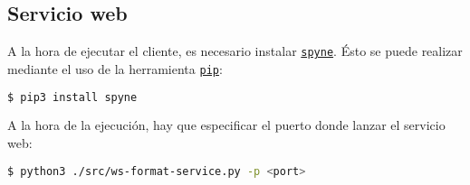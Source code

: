 \subsection{Servicio web}

A la hora de ejecutar el cliente, es necesario instalar \href{https://pypi.org/project/spyne/}{\texttt{spyne}}. Ésto se puede realizar mediante el uso de la herramienta \href{https://pypi.org/project/pip/}{\texttt{pip}}:

\begin{lstlisting}[language=bash]
    $ pip3 install spyne
\end{lstlisting}

A la hora de la ejecución, hay que especificar el puerto donde lanzar el servicio web:
\begin{lstlisting}[language=bash]
    $ python3 ./src/ws-format-service.py -p <port>
\end{lstlisting}